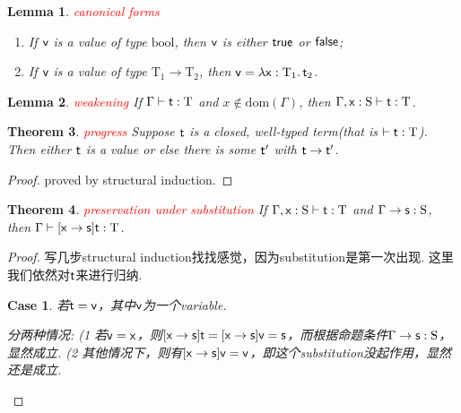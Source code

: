 \documentclass{article}
\theoremstyle{plain}
\newtheorem{theorem}{Theorem}
\newtheorem{lemma}[theorem]{Lemma}
\newtheorem{case}{Case}
\theoremstyle{nonumberplain}
\newtheorem{proof}{Proof}
\newcommand{\lam}[2]{\ensuremath{\lambda #1\ldotp #2}} %
\newcommand{\singletype}[1]{\text{#1}}
\newcommand{\termtype}[2]{\ensuremath{#1:#2}}
\newcommand{\term}[1]{\ensuremath\mathsf{#1}}
\newcommand{\redt}[1]{\textcolor{red}{#1}}
\begin{document}
\begin{lemma}
\rm \redt{canonical forms}
\begin{enumerate}
	\item If $\term{v}$ is a value of type $\singletype{bool}$, then $\term{v}$ is either $\term{true}$ or $\term{false}$;
	\item If $\term{v}$ is a value of type $\singletype{T}_1\to\singletype{T}_2$, then $\term{v} = \lam{\termtype{\term{x}}{\singletype{T}_1}}{\term{t}_2}$.
\end{enumerate}
\end{lemma}

\begin{lemma}
\rm \redt{weakening} If $\Gamma \vdash \termtype{\term{t}}{\singletype{T}}$ and $x \notin \text{dom}(\Gamma)$, then $\Gamma, \termtype{\term{x}}{\singletype{S}} \vdash \termtype{\term{t}}{\singletype{T}}$.
\end{lemma}

\begin{theorem}
\rm \redt{progress} Suppose $\term{t}$ is a closed, well-typed term(that is $\vdash \termtype{\term{t}}{\singletype{T}}$). Then either $\term{t}$ is a value or else there is some $\term{t}'$ with $\term{t} \to \term{t}'$. 
\end{theorem}

\begin{proof}
proved by structural induction.
\end{proof}

\begin{theorem}
\rm \redt{preservation under substitution} If $\Gamma,  \termtype{\term{x}}{\singletype{S}} \vdash \termtype{\term{t}}{\singletype{T}}$ and $\Gamma \to \termtype{\term{s}}{\singletype{S}}$, then $\Gamma \vdash \termtype{[\term{x} \to \term{s}]\term{t}}{\singletype{T}}$.
\end{theorem}

\begin{proof}
\rm 写几步structural induction找找感觉，因为substitution是第一次出现. 这里我们依然对$\term{t}$来进行归纳.  

\begin{case}
若$\term{t} = \term{v}$，其中$\term{v}$为一个variable. 

分两种情况: (1 若$\term{v} = \term{x}$，则$[\term{x} \to \term{s}]\term{t} = [\term{x} \to \term{s}]\term{v} = \term{s}$，而根据命题条件$\Gamma \to \termtype{\term{s}}{\singletype{S}}$，显然成立. (2 其他情况下，则有$[\term{x} \to \term{s}]\term{v} = \term{v}$，即这个substitution没起作用，显然还是成立. 
\end{case}
\end{proof}
\end{document}
